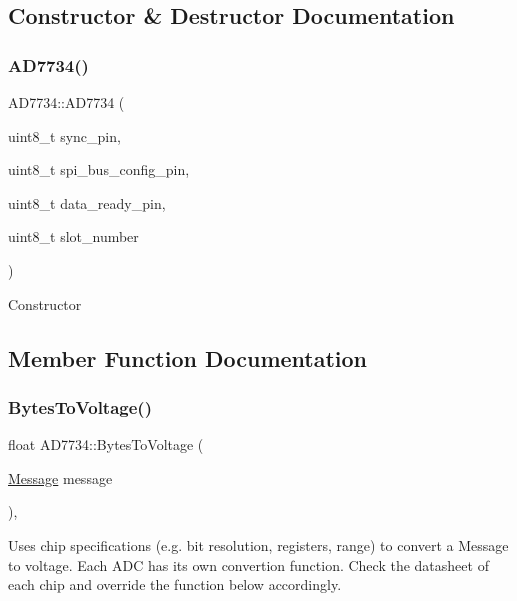 \subsection{Constructor \& Destructor Documentation}
\mbox{\label{classAD7734_a2bf3cea4357919fda364b8121cd6af4f}} 
\subsubsection{\texorpdfstring{A\+D7734()}{AD7734()}}
{\footnotesize\ttfamily A\+D7734\+::\+A\+D7734 (\begin{DoxyParamCaption}\item[{uint8\+\_\+t}]{sync\+\_\+pin,  }\item[{uint8\+\_\+t}]{spi\+\_\+bus\+\_\+config\+\_\+pin,  }\item[{uint8\+\_\+t}]{data\+\_\+ready\+\_\+pin,  }\item[{uint8\+\_\+t}]{slot\+\_\+number }\end{DoxyParamCaption})}

Constructor 

\subsection{Member Function Documentation}
\mbox{\label{classAD7734_afe43654ed83d2af599bea00b93cedc28}} 
\subsubsection{\texorpdfstring{Bytes\+To\+Voltage()}{BytesToVoltage()}}
{\footnotesize\ttfamily float A\+D7734\+::\+Bytes\+To\+Voltage (\begin{DoxyParamCaption}\item[{\mbox{\hyperlink{structAdcSpi_1_1Message}{Message}}}]{message }\end{DoxyParamCaption})\hspace{0.3cm}{\ttfamily [protected]}, {\ttfamily [virtual]}}

Uses chip specifications (e.\+g. bit resolution, registers, range) to convert a Message to voltage. Each A\+DC has its own convertion function. Check the datasheet of each chip and override the function below accordingly. 


